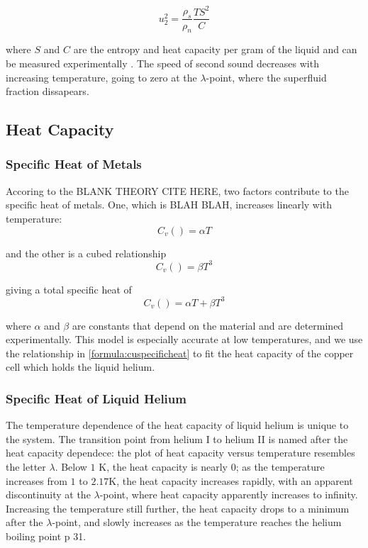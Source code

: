 \begin{equation}
u_2^2 = \frac{\rho_s}{\rho_n}\frac{T S^2}{C}
\end{equation}

where $S$ and $C$ are the entropy and heat capacity per gram of the
liquid and can be measured experimentally \cite{atkins}. The
speed of second sound decreases with increasing temperature, going
to zero at the $\lambda$-point, where the superfluid fraction
dissapears.

\subsection{Heat Capacity}

\subsubsection{Specific Heat of Metals}

Accoring to the BLANK THEORY CITE HERE, two factors contribute to the
specific heat of metals. One, which is BLAH BLAH, increases linearly with temperature:
\begin{equation}
C_v() = \alpha T
\end{equation}

and the other is a cubed relationship
\begin{equation}
C_v() = \beta T^3
\end{equation}

giving a total specific heat of
\begin{equation}\label{formula:cuspecificheat}
C_v() =  \alpha T + \beta T^3
\end{equation}

where $\alpha$ and $\beta$ are constants that depend on the material
and are determined experimentally. This model is especially accurate
at low temperatures, and we use the relationship in
\ref{formula:cuspecificheat} to fit the heat capacity of the copper
cell which holds the liquid helium.

\subsubsection{Specific Heat of Liquid Helium}

The temperature dependence of the heat capacity of liquid helium is
unique to the system. The transition point from helium I to helium II
is named after the heat capacity dependece: the plot of heat capacity
versus temperature resembles the letter $\lambda$. Below $1$ K, the
heat capacity is nearly $0$; as the temperature increases from $1$ to
$2.17$K, the heat capacity increases rapidly, with an apparent
discontinuity at the $\lambda$-point, where heat capacity apparently
increases to infinity. Increasing the temperature still further, the
heat capacity drops to a minimum after the $\lambda$-point, and slowly
increases as the temperature reaches the helium boiling point p
31\cite{atkins}.

